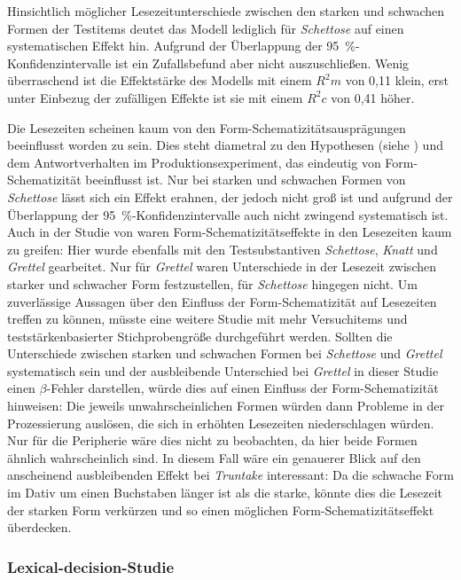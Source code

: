 Hinsichtlich möglicher Lesezeitunterschiede zwischen den starken und schwachen Formen der Test\-items deutet das Modell lediglich für \textit{Schettose} auf einen sys\-te\-ma\-tisch\-en Effekt hin. Aufgrund der Überlappung der 95~\%-Konfidenzintervalle ist ein Zufallsbefund aber nicht auszuschließen. Wenig überraschend ist die Effektstärke des Modells mit einem $R^2m$ von 0,11 klein, erst unter Einbezug der zufälligen Effekte ist sie mit einem $R^2c$ von 0,41 höher.  

Die Lesezeiten scheinen kaum von den Form-Schematizitätsausprägungen beeinflusst worden zu sein. Dies steht diametral zu den Hypothesen (siehe ) und dem Antwortverhalten im Produktionsexperiment, das eindeutig von Form-Schematizität beeinflusst ist. Nur bei starken und schwachen Formen von \textit{Schettose} lässt sich ein Effekt erahnen, der jedoch nicht groß ist und aufgrund der Überlappung der 95~\%-Konfidenzintervalle auch nicht zwingend sys\-te\-ma\-tisch ist. Auch in der Studie von \textcite[169--171]{Schmitt.2019} waren Form-Schematizitätseffekte in den Lesezeiten kaum zu greifen: Hier wurde ebenfalls mit den Testsubstantiven \textit{Schettose}, \textit{Knatt} und \textit{Grettel} gearbeitet. Nur für \textit{Grettel} waren Unterschiede in der Lesezeit zwischen starker und schwacher Form festzustellen, für \textit{Schettose} hingegen nicht. Um zuverlässige Aussagen über den Einfluss der Form-Schematizität auf Lesezeiten treffen zu können, müsste eine weitere Studie mit mehr Versuchitems und teststärkenbasierter Stichprobengröße durchgeführt werden. Sollten die Unterschiede zwischen starken und schwachen Formen bei \textit{Schettose} und \textit{Grettel} systematisch sein und der ausbleibende Unterschied bei \textit{Grettel} in dieser Studie einen $\beta$-Fehler darstellen, würde dies auf einen Einfluss der Form-Schematizität hinweisen: Die jeweils unwahrscheinlichen Formen würden dann Probleme in der Prozessierung auslösen, die sich in erhöhten Lesezeiten niederschlagen würden. Nur für die Peripherie wäre dies nicht zu beobachten, da hier beide Formen ähnlich wahrscheinlich sind. In diesem Fall wäre ein genauerer Blick auf den anscheinend ausbleibenden Effekt bei \textit{Truntake} interessant: Da die schwache Form im Dativ um einen Buchstaben länger ist als die starke, könnte dies die Lesezeit der starken Form verkürzen und so einen möglichen Form-Schematizitätseffekt überdecken. 

\subsubsection{Lexical-decision-Studie}

